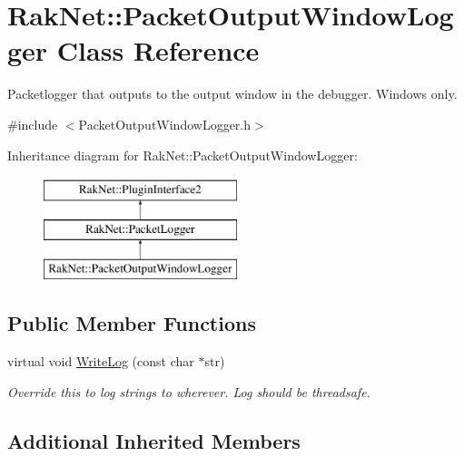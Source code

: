 \hypertarget{class_rak_net_1_1_packet_output_window_logger}{\section{Rak\-Net\-:\-:Packet\-Output\-Window\-Logger Class Reference}
\label{class_rak_net_1_1_packet_output_window_logger}
}


Packetlogger that outputs to the output window in the debugger. Windows only.  




{\ttfamily \#include $<$Packet\-Output\-Window\-Logger.\-h$>$}

Inheritance diagram for Rak\-Net\-:\-:Packet\-Output\-Window\-Logger\-:\begin{figure}[H]
\begin{center}
\leavevmode
\includegraphics[height=3.000000cm]{class_rak_net_1_1_packet_output_window_logger}
\end{center}
\end{figure}
\subsection*{Public Member Functions}
\begin{DoxyCompactItemize}
\item 
\hypertarget{class_rak_net_1_1_packet_output_window_logger_a119c66686d7a185ec2e815d8cbba4710}{virtual void \hyperlink{class_rak_net_1_1_packet_output_window_logger_a119c66686d7a185ec2e815d8cbba4710}{Write\-Log} (const char $\ast$str)}\label{class_rak_net_1_1_packet_output_window_logger_a119c66686d7a185ec2e815d8cbba4710}

\begin{DoxyCompactList}\small\item\em Override this to log strings to wherever. Log should be threadsafe. \end{DoxyCompactList}\end{DoxyCompactItemize}
\subsection*{Additional Inherited Members}



